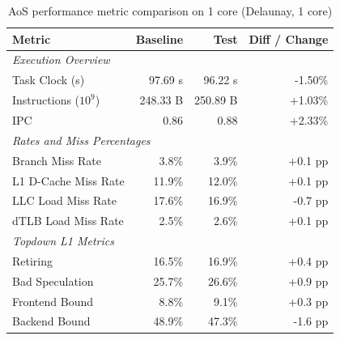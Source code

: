     \begin{table}[htbp]
      \centering
      \caption{AoS performance metric comparison on 1 core (Delaunay, 1 core)}
      \label{tab:perf_comparison_aos_delaunay_1core}
      \begin{tabular}{lrrr}
        \toprule
        \textbf{Metric} & \textbf{Baseline} & \textbf{Test} & \textbf{Diff / Change} \\
        \midrule
        \multicolumn{4}{l}{\textit{Execution Overview}} \\
        \quad Task Clock (s)           & 97.69 s   & 96.22 s   & -1.50\%   \\
        \quad Instructions ($10^9$)    & 248.33 B  & 250.89 B  & +1.03\%   \\
        \quad IPC                      & 0.86       & 0.88       & +2.33\%    \\
        \midrule
        \multicolumn{4}{l}{\textit{Rates and Miss Percentages}} \\
        \quad Branch Miss Rate         & 3.8\%      & 3.9\%      & +0.1 pp     \\
        \quad L1 D-Cache Miss Rate     & 11.9\%      & 12.0\%      & +0.1 pp    \\
        \quad LLC Load Miss Rate       & 17.6\%     & 16.9\%     & -0.7 pp    \\
        \quad dTLB Load Miss Rate      & 2.5\%      & 2.6\%      & +0.1 pp     \\
        \midrule
        \multicolumn{4}{l}{\textit{Topdown L1 Metrics}} \\
        \quad Retiring                 & 16.5\%     & 16.9\%     & +0.4 pp   \\
        \quad Bad Speculation          & 25.7\%     & 26.6\%     & +0.9 pp   \\
        \quad Frontend Bound           & 8.8\%     & 9.1\%     & +0.3 pp   \\
        \quad Backend Bound            & 48.9\%     & 47.3\%     & -1.6 pp   \\
        \bottomrule
      \end{tabular}
    \end{table}

